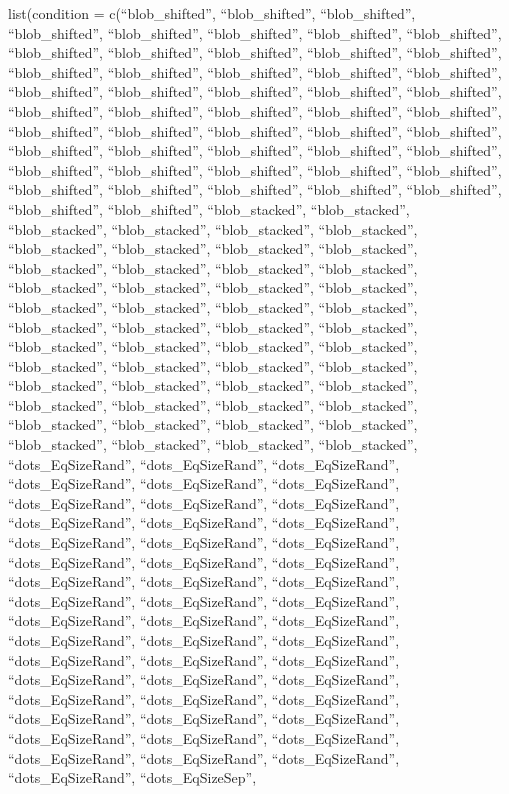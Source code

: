 \documentclass[
  man,floatsintext]{apa6}
\begin{document}
list(condition = c(``blob\_shifted'', ``blob\_shifted'', ``blob\_shifted'', ``blob\_shifted'', ``blob\_shifted'', ``blob\_shifted'', ``blob\_shifted'', ``blob\_shifted'', ``blob\_shifted'', ``blob\_shifted'', ``blob\_shifted'', ``blob\_shifted'', ``blob\_shifted'', ``blob\_shifted'', ``blob\_shifted'', ``blob\_shifted'', ``blob\_shifted'', ``blob\_shifted'', ``blob\_shifted'', ``blob\_shifted'', ``blob\_shifted'', ``blob\_shifted'', ``blob\_shifted'', ``blob\_shifted'', ``blob\_shifted'', ``blob\_shifted'', ``blob\_shifted'', ``blob\_shifted'', ``blob\_shifted'', ``blob\_shifted'', ``blob\_shifted'',
``blob\_shifted'', ``blob\_shifted'', ``blob\_shifted'', ``blob\_shifted'', ``blob\_shifted'', ``blob\_shifted'', ``blob\_shifted'', ``blob\_shifted'', ``blob\_shifted'', ``blob\_shifted'', ``blob\_shifted'', ``blob\_shifted'', ``blob\_shifted'', ``blob\_shifted'', ``blob\_shifted'', ``blob\_shifted'', ``blob\_shifted'', ``blob\_shifted'', ``blob\_shifted'', ``blob\_stacked'', ``blob\_stacked'', ``blob\_stacked'', ``blob\_stacked'', ``blob\_stacked'', ``blob\_stacked'', ``blob\_stacked'', ``blob\_stacked'', ``blob\_stacked'', ``blob\_stacked'', ``blob\_stacked'', ``blob\_stacked'', ``blob\_stacked'',
``blob\_stacked'', ``blob\_stacked'', ``blob\_stacked'', ``blob\_stacked'', ``blob\_stacked'', ``blob\_stacked'', ``blob\_stacked'', ``blob\_stacked'', ``blob\_stacked'', ``blob\_stacked'', ``blob\_stacked'', ``blob\_stacked'', ``blob\_stacked'', ``blob\_stacked'', ``blob\_stacked'', ``blob\_stacked'', ``blob\_stacked'', ``blob\_stacked'', ``blob\_stacked'', ``blob\_stacked'', ``blob\_stacked'', ``blob\_stacked'', ``blob\_stacked'', ``blob\_stacked'', ``blob\_stacked'', ``blob\_stacked'', ``blob\_stacked'', ``blob\_stacked'', ``blob\_stacked'', ``blob\_stacked'', ``blob\_stacked'', ``blob\_stacked'',
``blob\_stacked'', ``blob\_stacked'', ``blob\_stacked'', ``blob\_stacked'', ``blob\_stacked'', ``dots\_EqSizeRand'', ``dots\_EqSizeRand'', ``dots\_EqSizeRand'', ``dots\_EqSizeRand'', ``dots\_EqSizeRand'', ``dots\_EqSizeRand'', ``dots\_EqSizeRand'', ``dots\_EqSizeRand'', ``dots\_EqSizeRand'', ``dots\_EqSizeRand'', ``dots\_EqSizeRand'', ``dots\_EqSizeRand'', ``dots\_EqSizeRand'', ``dots\_EqSizeRand'', ``dots\_EqSizeRand'', ``dots\_EqSizeRand'', ``dots\_EqSizeRand'', ``dots\_EqSizeRand'', ``dots\_EqSizeRand'', ``dots\_EqSizeRand'', ``dots\_EqSizeRand'', ``dots\_EqSizeRand'', ``dots\_EqSizeRand'',
``dots\_EqSizeRand'', ``dots\_EqSizeRand'', ``dots\_EqSizeRand'', ``dots\_EqSizeRand'', ``dots\_EqSizeRand'', ``dots\_EqSizeRand'', ``dots\_EqSizeRand'', ``dots\_EqSizeRand'', ``dots\_EqSizeRand'', ``dots\_EqSizeRand'', ``dots\_EqSizeRand'', ``dots\_EqSizeRand'', ``dots\_EqSizeRand'', ``dots\_EqSizeRand'', ``dots\_EqSizeRand'', ``dots\_EqSizeRand'', ``dots\_EqSizeRand'', ``dots\_EqSizeRand'', ``dots\_EqSizeRand'', ``dots\_EqSizeRand'', ``dots\_EqSizeRand'', ``dots\_EqSizeRand'', ``dots\_EqSizeRand'', ``dots\_EqSizeRand'', ``dots\_EqSizeRand'', ``dots\_EqSizeRand'', ``dots\_EqSizeSep'',
\end{document}
